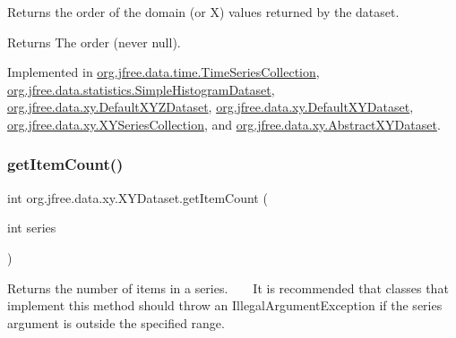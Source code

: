Returns the order of the domain (or X) values returned by the dataset.

\begin{DoxyReturn}{Returns}
The order (never {\ttfamily null}). 
\end{DoxyReturn}


Implemented in \mbox{\hyperlink{classorg_1_1jfree_1_1data_1_1time_1_1_time_series_collection_add31c4755cd5492cdc1a6e3055530467}{org.\+jfree.\+data.\+time.\+Time\+Series\+Collection}}, \mbox{\hyperlink{classorg_1_1jfree_1_1data_1_1statistics_1_1_simple_histogram_dataset_a5f4f64559cabfd40b1879e5ab9402399}{org.\+jfree.\+data.\+statistics.\+Simple\+Histogram\+Dataset}}, \mbox{\hyperlink{classorg_1_1jfree_1_1data_1_1xy_1_1_default_x_y_z_dataset_a9e4e89eafc3996ec5c9fd10f6d3891a4}{org.\+jfree.\+data.\+xy.\+Default\+X\+Y\+Z\+Dataset}}, \mbox{\hyperlink{classorg_1_1jfree_1_1data_1_1xy_1_1_default_x_y_dataset_ae665218f6d5daa96f37e198265f72200}{org.\+jfree.\+data.\+xy.\+Default\+X\+Y\+Dataset}}, \mbox{\hyperlink{classorg_1_1jfree_1_1data_1_1xy_1_1_x_y_series_collection_a4b80b66e0dc0f3aa894d151cf0507711}{org.\+jfree.\+data.\+xy.\+X\+Y\+Series\+Collection}}, and \mbox{\hyperlink{classorg_1_1jfree_1_1data_1_1xy_1_1_abstract_x_y_dataset_a5c1bd55a50eb79df12c9d50894f74866}{org.\+jfree.\+data.\+xy.\+Abstract\+X\+Y\+Dataset}}.

\mbox{\label{interfaceorg_1_1jfree_1_1data_1_1xy_1_1_x_y_dataset_ae81f9de91dfcae45028fc8a486a119da}} 
\subsubsection{\texorpdfstring{get\+Item\+Count()}{getItemCount()}}
{\footnotesize\ttfamily int org.\+jfree.\+data.\+xy.\+X\+Y\+Dataset.\+get\+Item\+Count (\begin{DoxyParamCaption}\item[{int}]{series }\end{DoxyParamCaption})}

Returns the number of items in a series. ~\newline
~\newline
 It is recommended that classes that implement this method should throw an {\ttfamily Illegal\+Argument\+Exception} if the {\ttfamily series} argument is outside the specified range.



